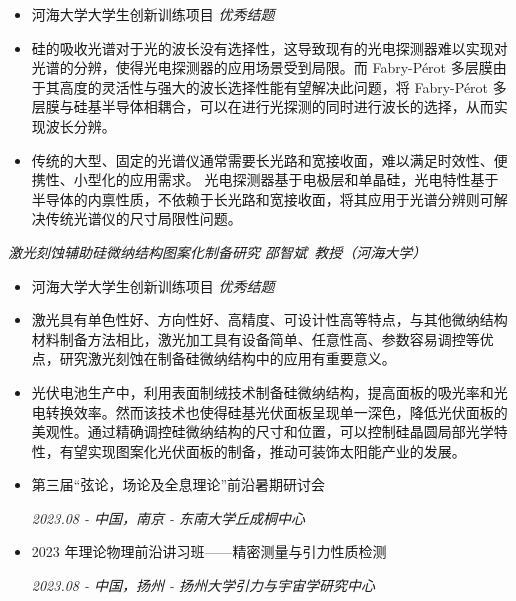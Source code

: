 \documentclass[12pt]{article}
\begin{document}
\begin{itemize}[noitemsep,nolistsep]
    \item 河海大学大学生创新训练项目 \textit{优秀结题}
    \item 硅的吸收光谱对于光的波长没有选择性，这导致现有的光电探测器难以实现对光谱的分辨，使得光电探测器的应用场景受到局限。而 Fabry-P\'{e}rot 多层膜由于其高度的灵活性与强大的波长选择性能有望解决此问题，将 Fabry-P\'{e}rot 多层膜与硅基半导体相耦合，可以在进行光探测的同时进行波长的选择，从而实现波长分辨。
    \item 传统的大型、固定的光谱仪通常需要长光路和宽接收面，难以满足时效性、便携性、小型化的应用需求。 光电探测器基于电极层和单晶硅，光电特性基于半导体的内禀性质，不依赖于长光路和宽接收面，将其应用于光谱分辨则可解决传统光谱仪的尺寸局限性问题。
\end{itemize}

\smallskip \quad \textit{激光刻蚀辅助硅微纳结构图案化制备研究 \hfill 邵智斌\ 教授（河海大学）}

\begin{itemize}[noitemsep,nolistsep]
    \item 河海大学大学生创新训练项目 \textit{优秀结题}
    \item 激光具有单色性好、方向性好、高精度、可设计性高等特点，与其他微纳结构材料制备方法相比，激光加工具有设备简单、任意性高、参数容易调控等优点，研究激光刻蚀在制备硅微纳结构中的应用有重要意义。
    \item 光伏电池生产中，利用表面制绒技术制备硅微纳结构，提高面板的吸光率和光电转换效率。然而该技术也使得硅基光伏面板呈现单一深色，降低光伏面板的美观性。通过精确调控硅微纳结构的尺寸和位置，可以控制硅晶圆局部光学特性，有望实现图案化光伏面板的制备，推动可装饰太阳能产业的发展。
\end{itemize}



\begin{itemize}[noitemsep,nolistsep]
    \item 第三届“弦论，场论及全息理论”前沿暑期研讨会
    
    \hfill \textit{2023.08 - 中国，南京 - 东南大学丘成桐中心}
    \item 2023 年理论物理前沿讲习班——精密测量与引力性质检测
    
    \hfill \textit{2023.08 - 中国，扬州 - 扬州大学引力与宇宙学研究中心}
\end{itemize}

\end{document}
